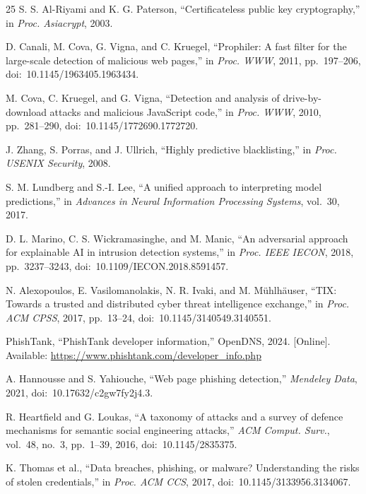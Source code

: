 \documentclass[conference]{IEEEtran}
\begin{document}
\begin{thebibliography}{25}
S. S. Al-Riyami and K. G. Paterson, ``Certificateless public key cryptography,'' in
\emph{Proc. Asiacrypt}, 2003.

D. Canali, M. Cova, G. Vigna, and C. Kruegel, ``Prophiler: A fast filter for the large-scale
detection of malicious web pages,'' in \emph{Proc. WWW}, 2011, pp.~197--206,
doi:~10.1145/1963405.1963434.

M. Cova, C. Kruegel, and G. Vigna, ``Detection and analysis of drive-by-download attacks and
malicious JavaScript code,'' in \emph{Proc. WWW}, 2010, pp.~281--290,
doi:~10.1145/1772690.1772720.

J. Zhang, S. Porras, and J. Ullrich, ``Highly predictive blacklisting,'' in
\emph{Proc. USENIX Security}, 2008.

S. M. Lundberg and S.-I. Lee, ``A unified approach to interpreting model predictions,'' in
\emph{Advances in Neural Information Processing Systems}, vol.~30, 2017.

D. L. Marino, C. S. Wickramasinghe, and M. Manic, ``An adversarial approach for explainable AI
in intrusion detection systems,'' in \emph{Proc. IEEE IECON}, 2018, pp.~3237--3243,
doi:~10.1109/IECON.2018.8591457.

N. Alexopoulos, E. Vasilomanolakis, N. R. Ivaki, and M. M\"{u}hlh\"{a}user, ``TIX: Towards a
trusted and distributed cyber threat intelligence exchange,'' in \emph{Proc. ACM CPSS}, 2017,
pp.~13--24, doi:~10.1145/3140549.3140551.

PhishTank, ``PhishTank developer information,'' OpenDNS, 2024. [Online].
Available: \url{https://www.phishtank.com/developer_info.php}

A. Hannousse and S. Yahiouche, ``Web page phishing detection,'' \emph{Mendeley Data}, 2021,
doi:~10.17632/c2gw7fy2j4.3.

R. Heartfield and G. Loukas, ``A taxonomy of attacks and a survey of defence mechanisms for
semantic social engineering attacks,'' \emph{ACM Comput. Surv.}, vol.~48, no.~3, pp.~1--39,
2016, doi:~10.1145/2835375.

K. Thomas et al., ``Data breaches, phishing, or malware? Understanding the risks of stolen
credentials,'' in \emph{Proc. ACM CCS}, 2017, doi:~10.1145/3133956.3134067.

\end{thebibliography}
\end{document}
